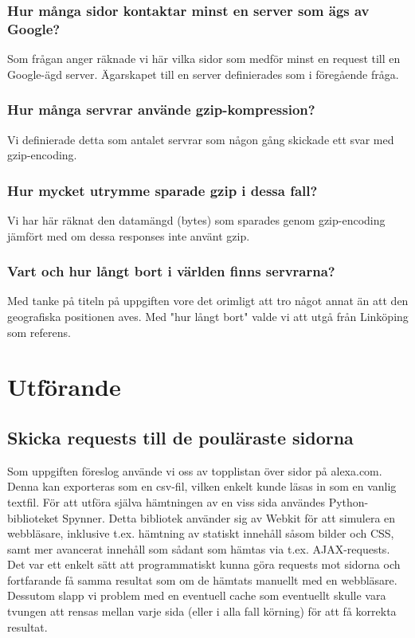 \documentclass[a4paper]{article}
\begin{document}
\subsubsection{Hur många sidor kontaktar minst en server som ägs av Google?}
Som frågan anger räknade vi här vilka sidor som medför minst en request till en Google-ägd server. Ägarskapet till en server definierades som i föregående fråga.\\

\subsubsection{Hur många servrar använde gzip-kompression?}
Vi definierade detta som antalet servrar som någon gång skickade ett svar med gzip-encoding.

\subsubsection{Hur mycket utrymme sparade gzip i dessa fall?}
Vi har här räknat den datamängd (bytes) som sparades genom gzip-encoding jämfört med om dessa responses inte använt gzip.

\subsubsection{Vart och hur långt bort i världen finns servrarna?}
Med tanke på titeln på uppgiften vore det orimligt att tro något annat än att den geografiska positionen aves. Med "hur långt bort" valde vi att utgå från Linköping som referens.


\section{Utförande}
\subsection{Skicka requests till de pouläraste sidorna}
Som uppgiften föreslog använde vi oss av topplistan över sidor på alexa.com. Denna kan exporteras som en csv-fil, vilken enkelt kunde läsas in som en vanlig textfil. För att utföra själva hämtningen av en viss sida användes Python-biblioteket Spynner. Detta bibliotek använder sig av Webkit för att simulera en webbläsare, inklusive t.ex. hämtning av statiskt innehåll såsom bilder och CSS, samt mer avancerat innehåll som sådant som hämtas via t.ex. AJAX-requests. Det var ett enkelt sätt att programmatiskt kunna göra requests mot sidorna och fortfarande få samma resultat som om de hämtats manuellt med en webbläsare. Dessutom slapp vi problem med en eventuell cache som eventuellt skulle vara tvungen att rensas mellan varje sida (eller i alla fall körning) för att få korrekta resultat.\\
\end{document}
